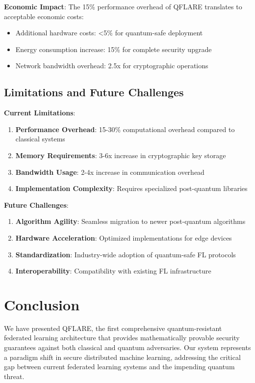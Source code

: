 \documentclass[onecolumn,11pt]{article}
\begin{document}
\textbf{Economic Impact}: The 15\% performance overhead of QFLARE translates to acceptable economic costs:
\begin{itemize}
\item Additional hardware costs: <5\% for quantum-safe deployment
\item Energy consumption increase: 15\% for complete security upgrade
\item Network bandwidth overhead: 2.5x for cryptographic operations
\end{itemize}

\subsection{Limitations and Future Challenges}

\textbf{Current Limitations}:
\begin{enumerate}
\item \textbf{Performance Overhead}: 15-30\% computational overhead compared to classical systems
\item \textbf{Memory Requirements}: 3-6x increase in cryptographic key storage
\item \textbf{Bandwidth Usage}: 2-4x increase in communication overhead
\item \textbf{Implementation Complexity}: Requires specialized post-quantum libraries
\end{enumerate}

\textbf{Future Challenges}:
\begin{enumerate}
\item \textbf{Algorithm Agility}: Seamless migration to newer post-quantum algorithms
\item \textbf{Hardware Acceleration}: Optimized implementations for edge devices
\item \textbf{Standardization}: Industry-wide adoption of quantum-safe FL protocols
\item \textbf{Interoperability}: Compatibility with existing FL infrastructure
\end{enumerate}

\section{Conclusion}
\label{sec:conclusion}

We have presented QFLARE, the first comprehensive quantum-resistant federated learning architecture that provides mathematically provable security guarantees against both classical and quantum adversaries. Our system represents a paradigm shift in secure distributed machine learning, addressing the critical gap between current federated learning systems and the impending quantum threat.
\end{document}

